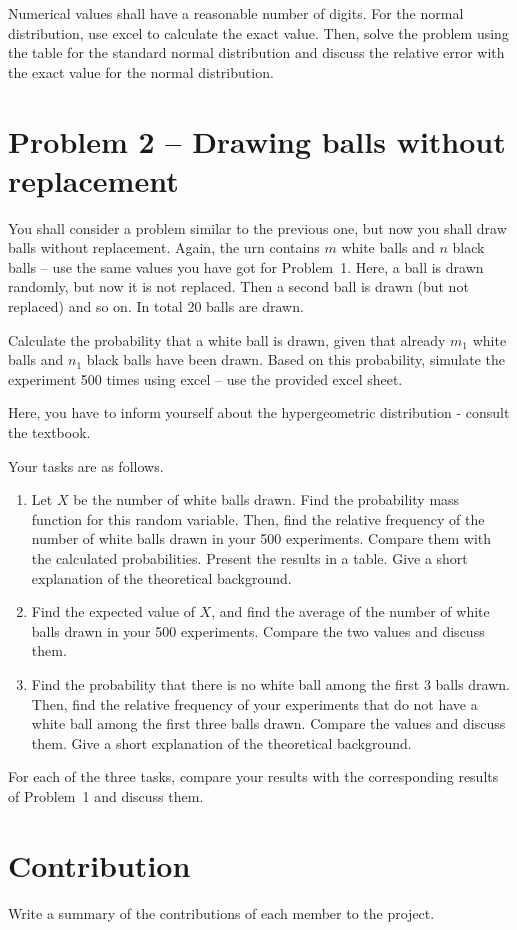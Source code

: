 \documentclass[12pt]{article}
\theoremstyle{definition}
\begin{document}
 Numerical values shall have a reasonable number of digits. For the normal distribution, use excel to calculate the exact value. Then, solve the problem using the table for the standard normal distribution and discuss the relative error with the exact value for the normal distribution.
 
 
 
 \section{Problem 2 -- Drawing balls without replacement}
 
 You shall consider a problem similar to the previous one, but now you shall draw balls without replacement. Again, the urn contains $m$ white balls and $n$ black balls  -- use the same values you have got for Problem~1. Here, a ball is drawn randomly, but now it is not replaced. Then a second ball is drawn (but not replaced) and so on. In total 20 balls are drawn.
 
 Calculate the probability that a white ball is drawn, given that already $m_1$ white balls and $n_1$ black balls have been drawn. Based on this probability, simulate the experiment 500 times using excel -- use the provided excel sheet. 
 
 Here, you have to inform yourself about the hypergeometric distribution - consult the textbook.
 
 Your tasks are as follows.
 \begin{enumerate}
 	\item Let $X$ be the number of white balls drawn. Find the probability mass function for this random variable. Then, find the relative frequency of the number of white balls drawn in your 500 experiments.
 	Compare them with the calculated probabilities. Present the results in a table. Give a short explanation of the theoretical background.
 	\item Find the expected value of $X$, and find the average of the number of white balls drawn in your 500 experiments. Compare the two values and discuss them. 
 	\item Find the probability that there is no white ball among the first 3 balls drawn. Then, find the relative frequency of your experiments that do not have a white ball among the first three balls drawn. Compare the values and discuss them. Give a short explanation of the theoretical background.
 \end{enumerate}
 
 For each of the three tasks, compare your results with the corresponding results of Problem~1 and discuss them.
 
 
\section{Contribution}

Write a summary of the contributions of each member to the project.
\end{document}
